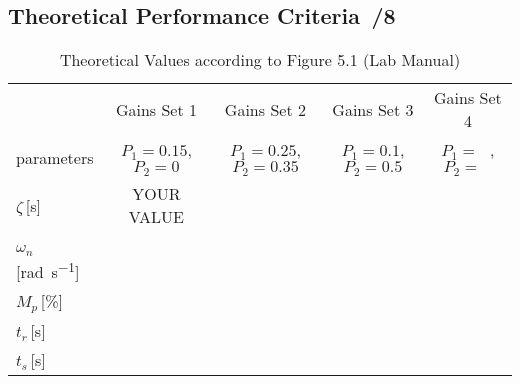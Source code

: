 \documentclass{article}
\newcommand{\score}{\hfill \underline{\hspace{0.65cm}}\,/} %
\begin{document}
\subsection{Theoretical Performance Criteria \score 8}
\begin{table}[phtb]\footnotesize 
\begin{center}
\caption{Theoretical Values according to Figure 5.1 (Lab Manual)}
\label{tbl:lab5_q1_1}
\begin{tabular}{l|m{1.2cm}|m{1.2cm}|m{1.2cm}|m{1.2cm}|m{1.2cm}|m{1.2cm}|m{1.2cm}|m{1.2cm}} \hline \hline
\cellcolor{lightgray} & \multicolumn{2}{c|}{\cellcolor{lightgray}Gains Set 1} & \multicolumn{2}{c|}{\cellcolor{lightgray}Gains Set 2} & \multicolumn{2}{c|}{\cellcolor{lightgray}Gains Set 3} & \multicolumn{2}{c}{\cellcolor{lightgray}Gains Set 4}\\ \cline{2-9}
\multirow{-2}{*}{\cellcolor{lightgray}parameters}& \multicolumn{2}{c|}{$P_1 = 0.15$, $P_2 = 0$}& \multicolumn{2}{c|}{$P_1 = 0.25$, $P_2 = 0.35$}& \multicolumn{2}{c|}{$P_1 = 0.1$, $P_2 = 0.5$}& \multicolumn{2}{c}{$P_1 = ~~~$, $P_2 = ~~~$}\\ \hline
$\zeta$\,[\si{\second}] & \multicolumn{2}{c|}{YOUR VALUE} & \multicolumn{2}{c|}{} & \multicolumn{2}{c|}{} & \multicolumn{2}{c}{} \\ \hline
$\omega_n$\,[\si{\radian\per\second}] & \multicolumn{2}{c|}{} & \multicolumn{2}{c|}{} & \multicolumn{2}{c|}{} & \multicolumn{2}{c}{} \\ \hline
$M_p$\,[\%]& \multicolumn{2}{c|}{} & \multicolumn{2}{c|}{~} & \multicolumn{2}{c|}{~} & \multicolumn{2}{c}{~} \\ \hline
$t_r$\,[\si{\second}] & \multicolumn{2}{c|}{} & \multicolumn{2}{c|}{} & \multicolumn{2}{c|}{} & \multicolumn{2}{c}{} \\ \hline
$t_s$\,[\si{\second}] & \multicolumn{2}{c|}{} & \multicolumn{2}{c|}{} & \multicolumn{2}{c|}{} & \multicolumn{2}{c}{} \\ \hline
\end{tabular}
\end{center}
\end{table}
\end{document}

